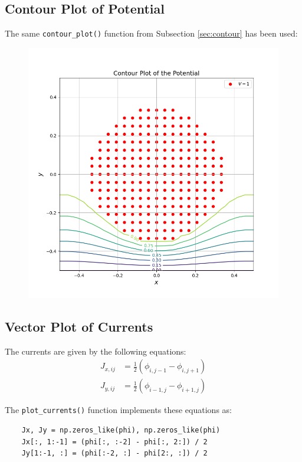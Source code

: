 \documentclass[12pt, a4paper]{article}
\newcommand{\code}{\lstinline[basicstyle=\small]}
\begin{document}
\subsection{Contour Plot of Potential}
The same \code{contour_plot()} function from Subsection \ref{sec:contour} has been used:
\begin{figure}[H]
    \centering
    \includegraphics[scale=0.425]{9.png}
\end{figure}


\subsection{Vector Plot of Currents}
The currents are given by the following equations:
\begin{align*}
    J_{x,ij} & = \frac{1}{2} (\phi_{i,j-1} - \phi_{i,j+1}) \\
    J_{y,ij} & = \frac{1}{2} (\phi_{i-1,j} - \phi_{i+1,j})
\end{align*}

The \code{plot_currents()} function implements these equations as:
\begin{lstlisting}
    Jx, Jy = np.zeros_like(phi), np.zeros_like(phi)
    Jx[:, 1:-1] = (phi[:, :-2] - phi[:, 2:]) / 2
    Jy[1:-1, :] = (phi[:-2, :] - phi[2:, :]) / 2
\end{lstlisting}
\end{document}
